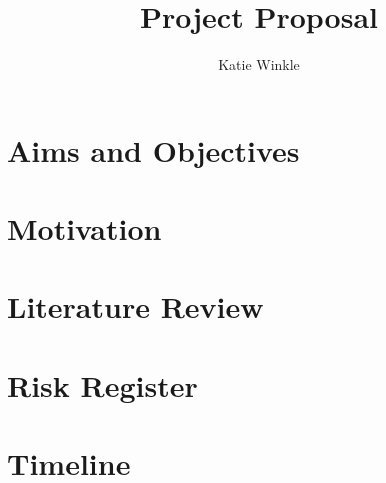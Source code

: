 \documentclass[]{article}
\title{Project Proposal}
\author{Katie Winkle}
\begin{document}
\maketitle

\begin{abstract}

\end{abstract}

\tableofcontents

\section{Aims and Objectives}
\section{Motivation}
\section{Literature Review}

\section{Risk Register}
\section{Timeline}
\end{document}
